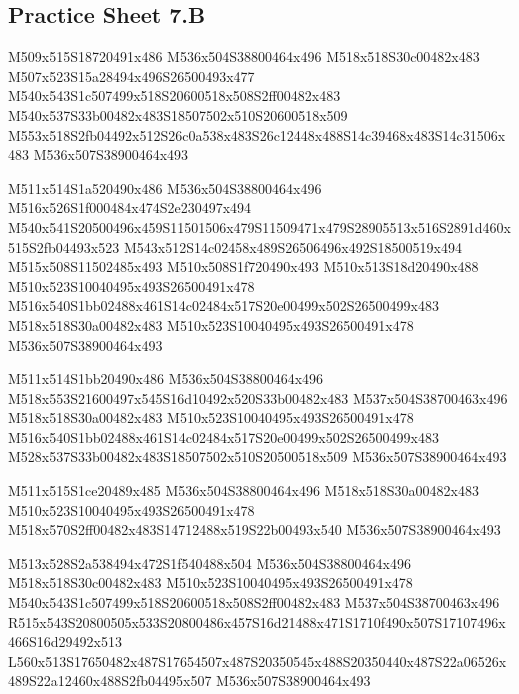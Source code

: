 \documentclass{article}
\begin{document}
\subsection{Practice Sheet 7.B}

\begin{multicols}{5}
\begin{center}

M509x515S18720491x486 %
M536x504S38800464x496 %
M518x518S30c00482x483 %
M507x523S15a28494x496S26500493x477 %
M540x543S1c507499x518S20600518x508S2ff00482x483 %
M540x537S33b00482x483S18507502x510S20600518x509 %
M553x518S2fb04492x512S26c0a538x483S26c12448x488S14c39468x483S14c31506x483 %
M536x507S38900464x493 %
\vfil
\columnbreak

M511x514S1a520490x486 %
M536x504S38800464x496 %
M516x526S1f000484x474S2e230497x494 %
M540x541S20500496x459S11501506x479S11509471x479S28905513x516S2891d460x515S2fb04493x523 %
M543x512S14c02458x489S26506496x492S18500519x494 %
M515x508S11502485x493 %
M510x508S1f720490x493 %
M510x513S18d20490x488 %
M510x523S10040495x493S26500491x478 %
M516x540S1bb02488x461S14c02484x517S20e00499x502S26500499x483 %
M518x518S30a00482x483 %
M510x523S10040495x493S26500491x478 %
M536x507S38900464x493 %
\vfil
\columnbreak

M511x514S1bb20490x486 %
M536x504S38800464x496 %
M518x553S21600497x545S16d10492x520S33b00482x483 %
M537x504S38700463x496 %
M518x518S30a00482x483 %
M510x523S10040495x493S26500491x478 %
M516x540S1bb02488x461S14c02484x517S20e00499x502S26500499x483 %
M528x537S33b00482x483S18507502x510S20500518x509 %
M536x507S38900464x493 %
\vfil
\columnbreak

M511x515S1ce20489x485 %
M536x504S38800464x496 %
M518x518S30a00482x483 %
M510x523S10040495x493S26500491x478 %
M518x570S2ff00482x483S14712488x519S22b00493x540 %
M536x507S38900464x493 %
\vfil
\columnbreak

M513x528S2a538494x472S1f540488x504 %
M536x504S38800464x496 %
M518x518S30c00482x483 %
M510x523S10040495x493S26500491x478 %
M540x543S1c507499x518S20600518x508S2ff00482x483 %
M537x504S38700463x496 %
R515x543S20800505x533S20800486x457S16d21488x471S1710f490x507S17107496x466S16d29492x513 %
L560x513S17650482x487S17654507x487S20350545x488S20350440x487S22a06526x489S22a12460x488S2fb04495x507 %
M536x507S38900464x493 %
\vfil

\end{center}
\end{multicols}
\end{document}

